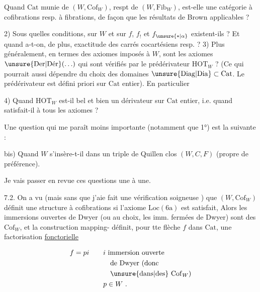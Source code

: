  Quand $\mathrm{Cat}$ munie de $(W,\mathrm{Cof}_W)$, respt de $(W,\mathrm{Fib}_W)$, est-elle une catégorie à cofibrations resp. à fibrations, de façon que les résultats de  Brown  applicables ?

2) Sous quelles conditions, sur $W$ et sur $f$, $f_!$ et $f_{\unsure{*|\alpha}}$ existent-ils ? Et quand a-t-on, de plus, exactitude des carrés cocartésiens resp.  ?
3) Plus généralement, en termes des axiomes imposés à $W$,  sont les axiomes $\unsure{\mathrm{Der}|\mathrm{D\acute er}}(\ldots)$ qui sont vérifiés par le prédérivateur $\mathrm{HOT}_W$ ? (Ce qui pourrait aussi dépendre du choix des domaines $\unsure{\mathrm{Diag}|\mathrm{Dia}}\subset\mathrm{Cat}$. Le prédérivateur est défini  priori sur $\mathrm{Cat}$  entier). En particulier

4) Quand $\mathrm{HOT}_W$ est-il bel et bien un dérivateur sur $\mathrm{Cat}$  entier, i.e. quand satisfait-il à tous les axiomes ?

Une question qui me paraît moins importante (notamment que 1°) est la suivante :

 bis) Quand $W$ s'insère-t-il dans un triple de Quillen clos $(W,C,F)$ (propre de préférence).

Je vais passer en revue ces questions une à une.

7.2. On a vu (mais sans que j'aie fait une vérification soigneuse )
 que $(W,\mathrm{Cof}_W)$ définit une structure à cofibrations si l'axiome \uline{$\mathrm{Loc}(6\mathrm{a})$} est satisfait,
Alors les immersions ouvertes de Dwyer (ou au choix, les imm. fermées de Dwyer) sont des $\mathrm{Cof}_W$, et la construction   mapping-\unsure{,} définit, pour tte flèche $f$ dans $\mathrm{Cat}$, une factorisation \uline{fonctorielle}

\[
\begin{aligned}
f=pi \qquad &i\ \text{immersion ouverte}\\
&\quad\text{de Dwyer (donc}\\
&\quad\text{\unsure{dans|des} }\mathrm{Cof}_W\text{)}\\
&p\in W\ .
\end{aligned}
\]

